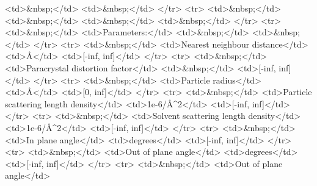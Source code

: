 \textless{}td\textgreater{}\&nbsp;\textless{}/td\textgreater{} \textless{}td\textgreater{}\&nbsp;\textless{}/td\textgreater{} \textless{}/tr\textgreater{} \textless{}tr\textgreater{} \textless{}td\textgreater{}\&nbsp;\textless{}/td\textgreater{} \textless{}td\textgreater{}\&nbsp;\textless{}/td\textgreater{} \textless{}td\textgreater{}\&nbsp;\textless{}/td\textgreater{} \textless{}td\textgreater{}\&nbsp;\textless{}/td\textgreater{} \textless{}/tr\textgreater{} \textless{}tr\textgreater{} \textless{}td\textgreater{}\&nbsp;\textless{}/td\textgreater{} \textless{}td\textgreater{}Parameters:\textless{}/td\textgreater{} \textless{}td\textgreater{}\&nbsp;\textless{}/td\textgreater{} \textless{}td\textgreater{}\&nbsp;\textless{}/td\textgreater{} \textless{}/tr\textgreater{} \textless{}tr\textgreater{} \textless{}td\textgreater{}\&nbsp;\textless{}/td\textgreater{} \textless{}td\textgreater{}Nearest neighbour distance\textless{}/td\textgreater{} \textless{}td\textgreater{}\AA{}\textless{}/td\textgreater{} \textless{}td\textgreater{}[-inf, inf]\textless{}/td\textgreater{} \textless{}/tr\textgreater{} \textless{}tr\textgreater{} \textless{}td\textgreater{}\&nbsp;\textless{}/td\textgreater{} \textless{}td\textgreater{}Paracrystal distortion factor\textless{}/td\textgreater{} \textless{}td\textgreater{}\&nbsp;\textless{}/td\textgreater{} \textless{}td\textgreater{}[-inf, inf]\textless{}/td\textgreater{} \textless{}/tr\textgreater{} \textless{}tr\textgreater{} \textless{}td\textgreater{}\&nbsp;\textless{}/td\textgreater{} \textless{}td\textgreater{}Particle radius\textless{}/td\textgreater{} \textless{}td\textgreater{}\AA{}\textless{}/td\textgreater{} \textless{}td\textgreater{}[0, inf]\textless{}/td\textgreater{} \textless{}/tr\textgreater{} \textless{}tr\textgreater{} \textless{}td\textgreater{}\&nbsp;\textless{}/td\textgreater{} \textless{}td\textgreater{}Particle scattering length density\textless{}/td\textgreater{} \textless{}td\textgreater{}1e-6/\AA{}\textasciicircum{}2\textless{}/td\textgreater{} \textless{}td\textgreater{}[-inf, inf]\textless{}/td\textgreater{} \textless{}/tr\textgreater{} \textless{}tr\textgreater{} \textless{}td\textgreater{}\&nbsp;\textless{}/td\textgreater{} \textless{}td\textgreater{}Solvent scattering length density\textless{}/td\textgreater{} \textless{}td\textgreater{}1e-6/\AA{}\textasciicircum{}2\textless{}/td\textgreater{} \textless{}td\textgreater{}[-inf, inf]\textless{}/td\textgreater{} \textless{}/tr\textgreater{} \textless{}tr\textgreater{} \textless{}td\textgreater{}\&nbsp;\textless{}/td\textgreater{} \textless{}td\textgreater{}In plane angle\textless{}/td\textgreater{} \textless{}td\textgreater{}degrees\textless{}/td\textgreater{} \textless{}td\textgreater{}[-inf, inf]\textless{}/td\textgreater{} \textless{}/tr\textgreater{} \textless{}tr\textgreater{} \textless{}td\textgreater{}\&nbsp;\textless{}/td\textgreater{} \textless{}td\textgreater{}Out of plane angle\textless{}/td\textgreater{} \textless{}td\textgreater{}degrees\textless{}/td\textgreater{} \textless{}td\textgreater{}[-inf, inf]\textless{}/td\textgreater{} \textless{}/tr\textgreater{} \textless{}tr\textgreater{} \textless{}td\textgreater{}\&nbsp;\textless{}/td\textgreater{} \textless{}td\textgreater{}Out of plane angle\textless{}/td\textgreater{} 